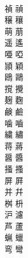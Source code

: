 \documentclass[8pt]{extreport}
\begin{document}
\begin{CJK}{UTF8}{min}
\\	禎	禎
\\	穣	穰
\\	萌	萠
\\	遥	遙
\\	唖	啞
\\	頴	穎
\\	鴎	鷗
\\	撹	攪
\\	麹	麴
\\	鹸	鹼
\\	噛	嚙
\\	繍	繡
\\	蒋	蔣
\\	醤	醬
\\	掻	搔
\\	屏	屛
\\	并	幷
\\	桝	枡
\\	沪	濾
\\	芦	蘆
\\	蝋	蠟
\\	弯	彎
\end{CJK}
\end{document}
